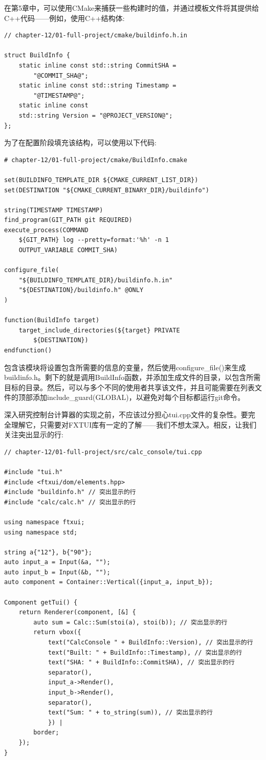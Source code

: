 在第5章中，可以使用CMake来捕获一些构建时的值，并通过模板文件将其提供给C++代码——例如，使用C++结构体:

\begin{lstlisting}[style=styleCXX]
// chapter-12/01-full-project/cmake/buildinfo.h.in

struct BuildInfo {
	static inline const std::string CommitSHA =
		"@COMMIT_SHA@";
	static inline const std::string Timestamp =
		"@TIMESTAMP@";
	static inline const
	std::string Version = "@PROJECT_VERSION@";
};
\end{lstlisting}

为了在配置阶段填充该结构，可以使用以下代码:

\begin{lstlisting}[style=styleCMake]
# chapter-12/01-full-project/cmake/BuildInfo.cmake

set(BUILDINFO_TEMPLATE_DIR ${CMAKE_CURRENT_LIST_DIR})
set(DESTINATION "${CMAKE_CURRENT_BINARY_DIR}/buildinfo")

string(TIMESTAMP TIMESTAMP)
find_program(GIT_PATH git REQUIRED)
execute_process(COMMAND
	${GIT_PATH} log --pretty=format:'%h' -n 1
	OUTPUT_VARIABLE COMMIT_SHA)

configure_file(
	"${BUILDINFO_TEMPLATE_DIR}/buildinfo.h.in"
	"${DESTINATION}/buildinfo.h" @ONLY
)

function(BuildInfo target)
	target_include_directories(${target} PRIVATE
		${DESTINATION})
endfunction()
\end{lstlisting}

包含该模块将设置包含所需要的信息的变量，然后使用configure\_file()来生成buildinfo.h。剩下的就是调用BuildInfo函数，并添加生成文件的目录，以包含所需目标的目录。然后，可以与多个不同的使用者共享该文件，并且可能需要在列表文件的顶部添加include\_guard(GLOBAL)，以避免对每个目标都运行git命令。

深入研究控制台计算器的实现之前，不应该过分担心tui.cpp文件的复杂性。要完全理解它，只需要对FXTUI库有一定的了解——我们不想太深入。相反，让我们关注突出显示的行:

\begin{lstlisting}[style=styleCXX]
// chapter-12/01-full-project/src/calc_console/tui.cpp

#include "tui.h"
#include <ftxui/dom/elements.hpp>
#include "buildinfo.h" // 突出显示的行
#include "calc/calc.h" // 突出显示的行

using namespace ftxui;
using namespace std;

string a{"12"}, b{"90"};
auto input_a = Input(&a, "");
auto input_b = Input(&b, "");
auto component = Container::Vertical({input_a, input_b});

Component getTui() {
	return Renderer(component, [&] {
		auto sum = Calc::Sum(stoi(a), stoi(b)); // 突出显示的行
		return vbox({
			text("CalcConsole " + BuildInfo::Version), // 突出显示的行
			text("Built: " + BuildInfo::Timestamp), // 突出显示的行
			text("SHA: " + BuildInfo::CommitSHA), // 突出显示的行
			separator(),
			input_a->Render(),
			input_b->Render(),
			separator(),
			text("Sum: " + to_string(sum)), // 突出显示的行
			}) |
		border;
	});
}
\end{lstlisting}

